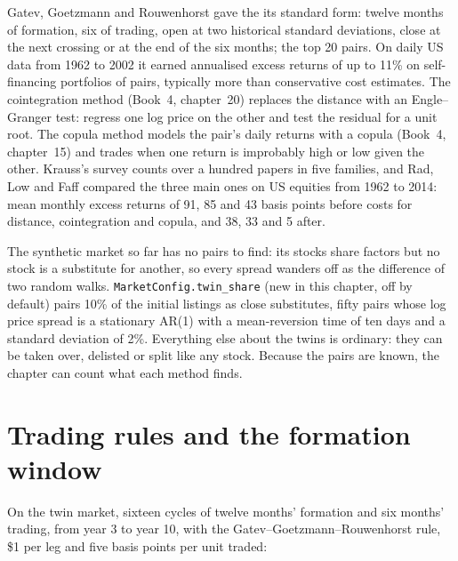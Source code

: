 Gatev, Goetzmann and Rouwenhorst gave the  its standard form: twelve months of formation, six of trading, open at two historical
standard deviations, close at the next crossing or at the end of the six months; the top 20 pairs. On daily US data from 1962 to 2002 it earned annualised
excess returns of up to 11\% on self-financing portfolios of pairs, typically more than conservative cost estimates. The cointegration method (Book~4,
chapter~20) replaces the distance with an Engle--Granger test: regress one log price on the other and test the residual for a unit root. The copula method
models the pair's daily returns with a copula (Book~4, chapter~15) and trades when one return is improbably high or low given the other. Krauss's survey
counts over a hundred papers in five families, and Rad, Low and Faff compared the three main ones on US equities from 1962 to 2014: mean monthly excess
returns of 91, 85 and 43 basis points before costs for distance, cointegration and copula, and 38, 33 and 5 after.

The synthetic market so far has no pairs to find: its stocks share factors but no stock is a substitute for another, so every spread wanders off as the
difference of two random walks. \texttt{MarketConfig.twin\_share} (new in this chapter, off by default) pairs 10\% of the initial listings as close
substitutes, fifty pairs whose log price spread is a stationary AR(1) with a mean-reversion time of ten days and a standard deviation of 2\%. Everything
else about the twins is ordinary: they can be taken over, delisted or split like any stock. Because the pairs are known, the chapter can count what each
method finds.

\section{Trading rules and the formation window}

On the twin market, sixteen cycles of twelve months' formation and six months' trading, from year 3 to year 10, with the Gatev--Goetzmann--Rouwenhorst rule,
\$1 per leg and five basis points per unit traded:

